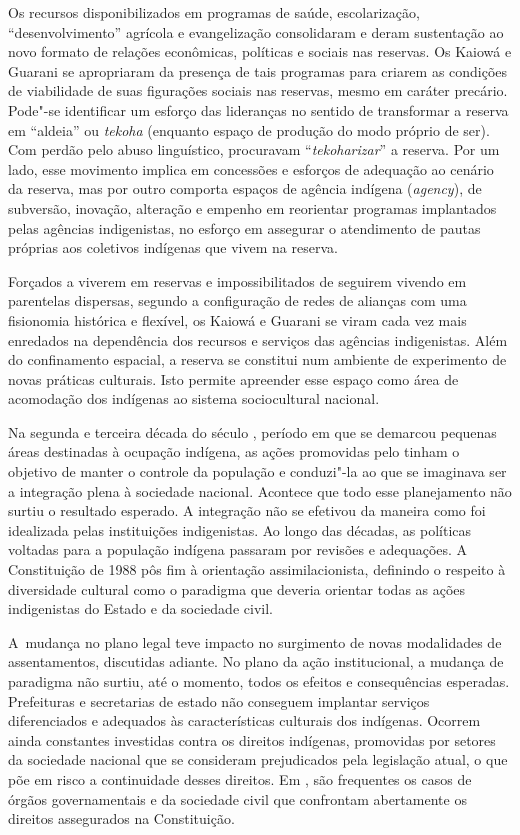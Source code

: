 Os recursos disponibilizados em programas de saúde, escolarização,
``desenvolvimento'' agrícola e evangelização consolidaram e deram
sustentação ao novo formato de relações econômicas, políticas e sociais
nas reservas. Os Kaiowá e Guarani se apropriaram da presença de tais
programas para criarem as condições de viabilidade de suas figurações
sociais nas reservas, mesmo em caráter precário. Pode"-se identificar um
esforço das lideranças no sentido de transformar a reserva em ``aldeia''
ou \emph{tekoha} (enquanto espaço de produção do modo próprio de ser). Com
perdão pelo abuso linguístico, procuravam ``\emph{tekoharizar}'' a reserva. Por
um lado, esse movimento implica em concessões e esforços de adequação
ao cenário da reserva, mas por outro comporta espaços de agência
indígena (\emph{agency}), de subversão, inovação, alteração e empenho em
reorientar programas implantados pelas agências indigenistas, no
esforço em assegurar o atendimento de pautas próprias aos coletivos
indígenas que vivem na reserva.  

Forçados a viverem em reservas e impossibilitados de seguirem vivendo em
parentelas dispersas, segundo a configuração de redes de alianças com
uma fisionomia histórica e flexível, os Kaiowá e Guarani se viram cada
vez mais enredados na dependência dos recursos e serviços das agências
indigenistas. Além do confinamento espacial, a reserva se constitui num
ambiente de experimento de novas práticas culturais. Isto permite
apreender esse espaço como área de acomodação dos indígenas ao sistema
sociocultural nacional.

Na segunda e terceira década do século , período em que se demarcou
pequenas áreas destinadas à ocupação indígena, as ações promovidas pelo
 tinham o objetivo de manter o controle da população e conduzi"-la ao
que se imaginava ser a integração plena à sociedade nacional. Acontece
que todo esse planejamento não surtiu o resultado esperado. A
integração não se efetivou da maneira como foi idealizada pelas
instituições indigenistas. Ao longo das décadas, as políticas voltadas
para a população indígena passaram por revisões e adequações. A
Constituição de 1988 pôs fim à orientação assimilacionista, definindo o
respeito à diversidade cultural como o paradigma que deveria orientar
todas as ações indigenistas do Estado e da sociedade civil. 

A~mudança no plano legal teve impacto no surgimento de novas modalidades
de assentamentos, discutidas adiante. No plano da ação institucional, a
mudança de paradigma não surtiu, até o momento, todos os efeitos e
consequências esperadas. Prefeituras e secretarias de estado não
conseguem implantar serviços diferenciados e adequados às
características culturais dos indígenas. Ocorrem ainda constantes
investidas contra os direitos indígenas, promovidas por setores da
sociedade nacional que se consideram prejudicados pela legislação
atual, o que põe em risco a continuidade desses direitos. Em , são
frequentes os casos de órgãos governamentais e da sociedade civil que
confrontam abertamente os direitos assegurados na Constituição.

